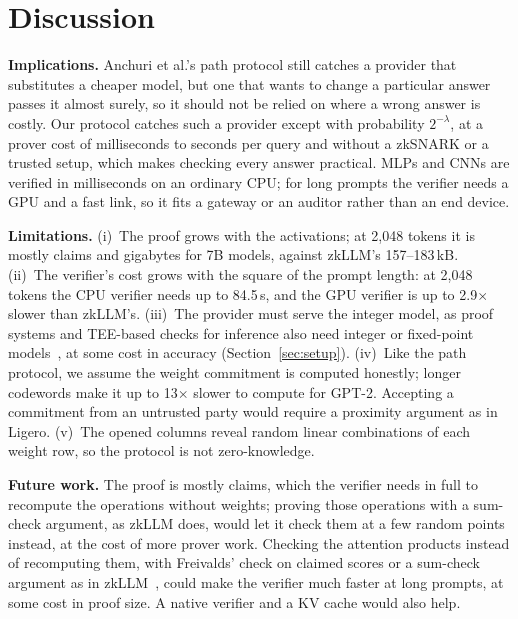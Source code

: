 \documentclass[sigconf,nonacm]{acmart}
\newcommand{\para}[1]{\par\noindent\textbf{#1}\quad}
\begin{document}
\section{Discussion}

\para{Implications.} Anchuri et al.'s path protocol still catches a provider that substitutes a
cheaper model, but one that wants to change a particular answer passes it almost surely, so it
should not be relied on where a wrong answer is costly. Our protocol catches such a provider except
with probability $2^{-\lambda}$, at a prover cost of milliseconds to seconds per query and without
a zkSNARK or a trusted setup, which makes checking every answer practical. MLPs and CNNs are
verified in milliseconds on an ordinary CPU; for long prompts the verifier needs a GPU and a fast link, so it fits a gateway or an auditor rather than an end device.

\para{Limitations.} (i)~The proof grows with the activations; at 2{,}048 tokens it is
mostly claims and gigabytes for 7B models, against zkLLM's 157--183\,kB. (ii)~The verifier's cost
grows with the square of the prompt length: at 2{,}048 tokens the CPU verifier needs up to
84.5\,s, and the GPU verifier is up to 2.9$\times$ slower than
zkLLM's. (iii)~The provider must serve the integer model,
as proof systems and TEE-based checks for inference also need integer or fixed-point models~\cite{safetynets,slalom,zkcnn,zen,zkml,zkllm}, at some cost
in accuracy (Section~\ref{sec:setup}). (iv)~Like the path protocol, we assume the weight commitment is computed honestly; longer codewords make it up to 13$\times$ slower to compute for GPT-2. Accepting a commitment from an untrusted
party would require a proximity argument as in Ligero. (v)~The opened columns reveal random linear combinations of each weight
row, so the protocol is not zero-knowledge. 

\para{Future work.} The proof is mostly claims, which the verifier needs in full to recompute the
operations without weights; proving those operations with a sum-check argument, as zkLLM does,
would let it check them at a few random points instead, at the cost of more prover work. Checking the attention products instead of
recomputing them, with Freivalds' check on claimed scores or a sum-check argument as in
zkLLM~\cite{zkllm}, could make the verifier much faster at long prompts, at some cost in proof
size. A native verifier and a KV cache would also
help. 
\end{document}
